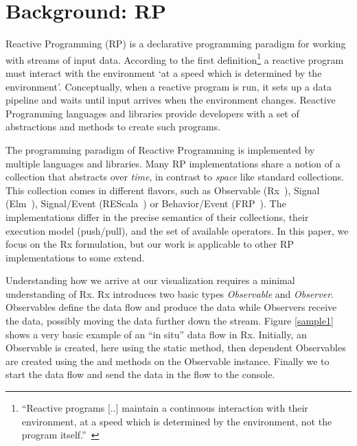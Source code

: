 \section{Background: RP}
\label{background}
\label{nutshell}

Reactive Programming (RP) is a declarative programming paradigm for working with streams of input data. 
According to the first definition\footnote{
``Reactive programs [..] maintain a continuous interaction with their environment, at a speed which is determined by the environment, not the program itself.''~\cite{berry1989real}
} a reactive program must interact with the environment `at a speed which is determined by the environment'.
Conceptually, when a reactive program is run, it sets up a data pipeline and waits until input arrives when the environment changes.
Reactive Programming languages and libraries provide developers with a set of abstractions and methods to create such programs.

The programming paradigm of Reactive Programming is implemented by multiple languages and libraries. 
Many RP implementations share a notion of a collection that abstracts over \emph{time}, in contrast to \emph{space} like standard collections.
This collection comes in different flavors, 
such as Observable (Rx~\cite{meijer2010subject}), 
Signal (Elm~\cite{czaplicki2012elm}), 
Signal/Event (REScala~\cite{salvaneschi2014rescala}) or 
Behavior/Event (FRP~\cite{elliott1997functional}).
The implementations differ in the precise semantics of their collections, their execution model (push/pull), and the set of available operators.  
In this paper, we focus on the Rx formulation, but our work is applicable to other RP implementations to some extend. 

Understanding how we arrive at our visualization requires a minimal understanding of Rx.
Rx introduces two basic types \emph{Observable} and \emph{Observer}. Observables define the data flow and produce the data while Observers receive the data, possibly moving the data further down the stream. Figure \ref{sample1} shows a very basic example of an ``in situ'' data flow in Rx. Initially, an Observable is created, here using the static  method, then dependent Observables are created using the  and  methods on the Observable instance. Finally we  to start the data flow and send the data in the flow to the console.


